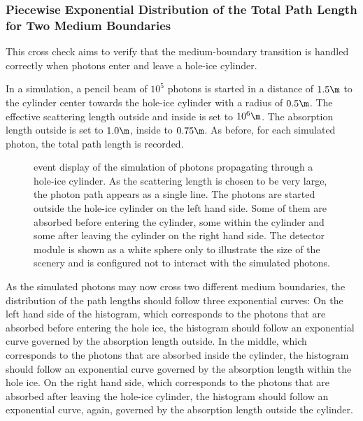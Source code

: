 

\subsubsection{Piecewise Exponential Distribution of the Total Path Length for Two Medium Boundaries}


This cross check aims to verify that the medium-boundary transition is handled correctly when photons enter and leave a hole-ice cylinder.

In a simulation, a pencil beam of $10^5$ photons is started in a distance of $1.5\m$ to the cylinder center towards the hole-ice cylinder with a radius of $0.5\m$. The effective scattering length outside and inside is set to $10^6\m$. The absorption length outside is set to $1.0\m$, inside to $0.75\m$.
As before, for each simulated photon, the total path length is recorded.


\begin{figure}
  \caption{\steamshovel event display of the simulation of photons propagating through a hole-ice cylinder. As the scattering length is chosen to be very large, the photon path appears as a single line.  The photons are started outside the hole-ice cylinder on the left hand side. Some of them are absorbed before entering the cylinder, some within the cylinder and some after leaving the cylinder on the right hand side. The detector module is shown as a white sphere only to illustrate the size of the scenery and is configured not to interact with the simulated photons.}
\end{figure}

As the simulated photons may now cross two different medium boundaries, the distribution of the path lengths should follow three exponential curves: On the left hand side of the histogram, which corresponds to the photons that are absorbed before entering the hole ice, the histogram should follow an exponential curve governed by the absorption length outside. In the middle, which corresponds to the photons that are absorbed inside the cylinder, the histogram should follow an exponential curve governed by the absorption length within the hole ice. On the right hand side, which corresponds to the photons that are absorbed after leaving the hole-ice cylinder, the histogram should follow an exponential curve, again, governed by the absorption length outside the cylinder.

